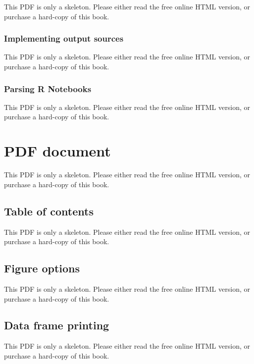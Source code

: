 \documentclass[
  11pt,
]{krantz}
\theoremstyle{definition}
\theoremstyle{definition}
\theoremstyle{definition}
\theoremstyle{definition}
\theoremstyle{remark}
\begin{document}
This PDF is only a skeleton. Please either read the free online HTML version, or purchase a hard-copy of this book.

\subsubsection{Implementing output sources}\label{implementing-output-sources}

This PDF is only a skeleton. Please either read the free online HTML version, or purchase a hard-copy of this book.

\subsubsection{Parsing R Notebooks}\label{parsing-r-notebooks}

This PDF is only a skeleton. Please either read the free online HTML version, or purchase a hard-copy of this book.

\section{PDF document}\label{pdf-document}

This PDF is only a skeleton. Please either read the free online HTML version, or purchase a hard-copy of this book.

\subsection{Table of contents}\label{table-of-contents-1}

This PDF is only a skeleton. Please either read the free online HTML version, or purchase a hard-copy of this book.

\subsection{Figure options}\label{figure-options-1}

This PDF is only a skeleton. Please either read the free online HTML version, or purchase a hard-copy of this book.

\subsection{Data frame printing}\label{data-frame-printing-1}

This PDF is only a skeleton. Please either read the free online HTML version, or purchase a hard-copy of this book.
\end{document}
